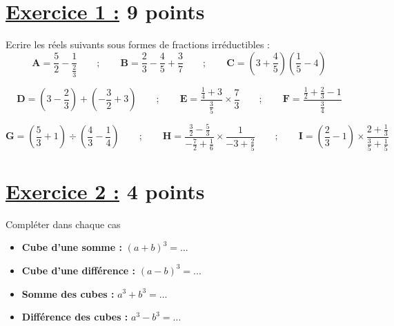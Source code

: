 \documentclass[12pt,a4paper]{article}
\begin{document}
\renewcommand{\arraystretch}{1.5}
\renewcommand{\arrayrulewidth}{1.2pt}
\vspace{3cm}

\section*{\underline{Exercice 1 :} 9 points}
Ecrire les réels suivants sous formes de fractions irréductibles :
\[
\textbf{A}=\frac{5}{2}-\frac{1}{\frac{2}{3}} \quad\quad;\quad\quad \textbf{B}=\frac{2}{3}-\frac{4}{5}+\frac{3}{7} \quad\quad;\quad\quad \textbf{C}=\left(3+\frac{4}{5} \right) \left(\frac{1}{5}-4 \right) 
\]

\[
\textbf{D}=\left(3-\frac{2}{3} \right) + \left(-\frac{3}{2}+3 \right) \quad\quad;\quad\quad \textbf{E}=\frac{\frac{1}{4}+3}{\frac{3}{5}} \times \frac{7}{3} \quad\quad;\quad\quad
\textbf{F}= \frac{\frac{1}{2}+\frac{2}{3}-1}{\frac{3}{4}}
\]

\[
 \textbf{G}= \left(\frac{5}{3}+1 \right) \div \left(\frac{4}{3}-\frac{1}{4} \right)\quad\quad;\quad\quad
 \textbf{H}=\frac{\frac{3}{2}-\frac{5}{3}}{-\frac{7}{2}+\frac{1}{6}} \times \frac{1}{-3+\frac{2}{5}}
 \quad\quad;\quad\quad \textbf{I}=\left(\frac{2}{3}-1 \right)\times \frac{2+\frac{1}{3}}{\frac{3}{5}+\frac{1}{5}}
\]
\section*{\underline{Exercice 2 :} 4 points}
Compléter dans chaque cas
\begin{itemize}
    \item \textbf{Cube d'une somme :} \quad $(a + b)^3 = ...$
    \item \textbf{Cube d'une différence :} \quad $(a - b)^3 = ...$
    \item \textbf{Somme des cubes :} \quad $a^3 + b^3 = ...$
    \item \textbf{Différence des cubes :} \quad $a^3 - b^3 = ...$
\end{itemize}
\end{document}
